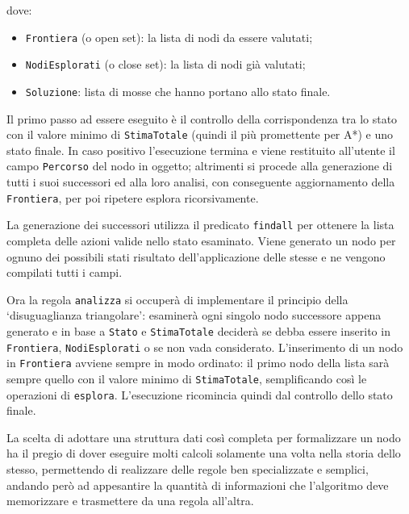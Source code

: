 \documentclass[a4paper,oneside,12pt]{book}
\def \code#1{\texttt{#1}}
\begin{document}
	dove:
	\begin{itemize}
		\item \code{Frontiera} (o open set): la lista di nodi da essere valutati;
		\item \code{NodiEsplorati} (o close set): la lista di nodi già valutati;
		\item \code{Soluzione}: lista di mosse che hanno portano allo stato finale.
	\end{itemize}

	Il primo passo ad essere eseguito è il controllo della corrispondenza tra lo stato con il valore minimo di \code{StimaTotale} (quindi il più promettente per A*) e uno stato finale. In caso positivo l’esecuzione termina e viene restituito all’utente il campo \code{Percorso} del nodo in oggetto; altrimenti si procede alla generazione di tutti i suoi successori ed alla loro analisi, con conseguente aggiornamento della \code{Frontiera}, per poi ripetere esplora ricorsivamente.

	La generazione dei successori utilizza il predicato \code{findall} per ottenere la lista completa delle azioni valide nello stato esaminato. Viene generato un nodo per ognuno dei possibili stati risultato dell’applicazione delle stesse e ne vengono compilati tutti i campi.

	Ora la regola \code{analizza} si occuperà di implementare il principio della ‘disuguaglianza triangolare’: esaminerà ogni singolo nodo successore appena generato e in base a \code{Stato} e \code{StimaTotale} deciderà se debba essere inserito in \code{Frontiera}, \code{NodiEsplorati} o se non vada considerato. L’inserimento di un nodo in \code{Frontiera} avviene sempre in modo ordinato: il primo nodo della lista sarà sempre quello con il valore minimo di \code{StimaTotale}, semplificando così le operazioni di \code{esplora}. L’esecuzione ricomincia quindi dal controllo dello stato finale.

	La scelta di adottare una struttura dati così completa per formalizzare un nodo ha il pregio di dover eseguire molti calcoli solamente una volta nella storia dello stesso, permettendo di realizzare delle regole ben specializzate e semplici, andando però ad appesantire la quantità di informazioni che l’algoritmo deve memorizzare e trasmettere da una regola all’altra.
\end{document}
